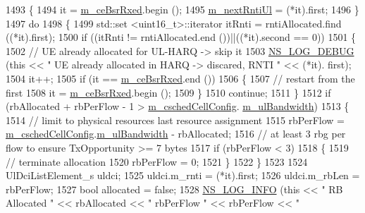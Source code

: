 \begin{DoxyCode}
1493     \{
1494       it = \hyperlink{classns3_1_1TdMtFfMacScheduler_a06bec792095027e46fcf5281e4f4e77a}{m\_ceBsrRxed}.begin ();
1495       \hyperlink{classns3_1_1TdMtFfMacScheduler_afc4fae2138add1ae9e42970e93046f52}{m\_nextRntiUl} = (*it).first;
1496     \}
1497   \textcolor{keywordflow}{do}
1498     \{
1499       std::set <uint16\_t>::iterator itRnti = rntiAllocated.find ((*it).first);
1500       \textcolor{keywordflow}{if} ((itRnti != rntiAllocated.end ())||((*it).second == 0))
1501         \{
1502           \textcolor{comment}{// UE already allocated for UL-HARQ -> skip it}
1503           \hyperlink{group__logging_ga413f1886406d49f59a6a0a89b77b4d0a}{NS\_LOG\_DEBUG} (\textcolor{keyword}{this} << \textcolor{stringliteral}{" UE already allocated in HARQ -> discared, RNTI "} << (*it).
      first);
1504           it++;
1505           \textcolor{keywordflow}{if} (it == \hyperlink{classns3_1_1TdMtFfMacScheduler_a06bec792095027e46fcf5281e4f4e77a}{m\_ceBsrRxed}.end ())
1506             \{
1507               \textcolor{comment}{// restart from the first}
1508               it = \hyperlink{classns3_1_1TdMtFfMacScheduler_a06bec792095027e46fcf5281e4f4e77a}{m\_ceBsrRxed}.begin ();
1509             \}
1510           \textcolor{keywordflow}{continue};
1511         \}
1512       \textcolor{keywordflow}{if} (rbAllocated + rbPerFlow - 1 > \hyperlink{classns3_1_1TdMtFfMacScheduler_a585412f686e33f49dad1003e5d2216f0}{m\_cschedCellConfig}.
      \hyperlink{structns3_1_1FfMacCschedSapProvider_1_1CschedCellConfigReqParameters_a5ab5b102878e6e7e7727a14af4a64d2f}{m\_ulBandwidth})
1513         \{
1514           \textcolor{comment}{// limit to physical resources last resource assignment}
1515           rbPerFlow = \hyperlink{classns3_1_1TdMtFfMacScheduler_a585412f686e33f49dad1003e5d2216f0}{m\_cschedCellConfig}.\hyperlink{structns3_1_1FfMacCschedSapProvider_1_1CschedCellConfigReqParameters_a5ab5b102878e6e7e7727a14af4a64d2f}{m\_ulBandwidth} - rbAllocated;
1516           \textcolor{comment}{// at least 3 rbg per flow to ensure TxOpportunity >= 7 bytes}
1517           \textcolor{keywordflow}{if} (rbPerFlow < 3)
1518             \{
1519               \textcolor{comment}{// terminate allocation}
1520               rbPerFlow = 0;      
1521             \}
1522         \}
1523 
1524       UlDciListElement\_s uldci;
1525       uldci.m\_rnti = (*it).first;
1526       uldci.m\_rbLen = rbPerFlow;
1527       \textcolor{keywordtype}{bool} allocated = \textcolor{keyword}{false};
1528       \hyperlink{group__logging_gafbd73ee2cf9f26b319f49086d8e860fb}{NS\_LOG\_INFO} (\textcolor{keyword}{this} << \textcolor{stringliteral}{" RB Allocated "} << rbAllocated << \textcolor{stringliteral}{" rbPerFlow "} << rbPerFlow << \textcolor{stringliteral}{"
}
\end{DoxyCode}
